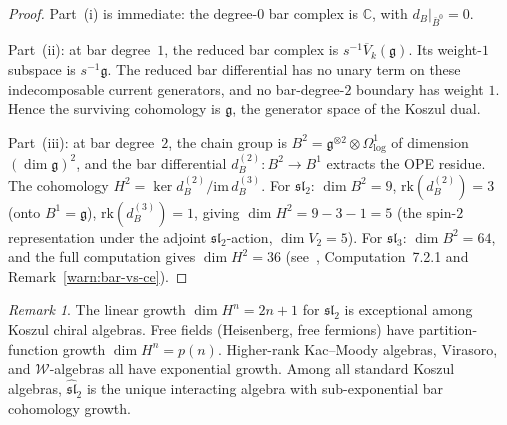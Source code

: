 \documentclass[11pt]{article}
\theoremstyle{plain}
\theoremstyle{definition}
\theoremstyle{remark}
\newtheorem{remark}[theorem]{Remark}
\newcommand{\fg}{\mathfrak{g}}
\newcommand{\fsl}{\mathfrak{sl}}
\newcommand{\barB}{\bar{B}}
\numberwithin{equation}{section}
\begin{document}
\begin{proof}
Part~(i) is immediate: the degree-$0$ bar complex is
$\mathbb{C}$, with $d_B|_{\barB^0} = 0$.

Part~(ii): at bar degree~$1$, the reduced bar complex is
\(s^{-1}\overline{V}_k(\fg)\). Its weight-\(1\) subspace is
\(s^{-1}\fg\). The reduced bar differential has no unary term on
these indecomposable current generators, and no bar-degree-\(2\)
boundary has weight \(1\). Hence the surviving cohomology is
\(\fg\), the generator space of the Koszul dual.

Part~(iii): at bar degree~$2$, the chain group is
$B^2 = \fg^{\otimes 2} \otimes \Omega^1_{\log}$
of dimension $(\dim\fg)^2$, and the bar differential
$d_B^{(2)}\colon B^2 \to B^1$ extracts the OPE
residue. The cohomology $H^2 = \ker d_B^{(2)} / \mathrm{im}\, d_B^{(3)}$.
For $\fsl_2$: $\dim B^2 = 9$, $\mathrm{rk}(d_B^{(2)}) = 3$
(onto $B^1 = \fg$), $\mathrm{rk}(d_B^{(3)}) = 1$,
giving $\dim H^2 = 9 - 3 - 1 = 5$
(the spin-$2$ representation under the adjoint
$\fsl_2$-action, $\dim V_2 = 5$).
For $\fsl_3$: $\dim B^2 = 64$, and the full computation
gives $\dim H^2 = 36$ (see~\cite{Lor-MKD},
Computation~7.2.1 and Remark~\ref{warn:bar-vs-ce}).
\end{proof}

\begin{remark}\label{rem:linear-growth}
The linear growth $\dim H^n = 2n + 1$ for $\fsl_2$
is exceptional among Koszul chiral algebras. Free fields
(Heisenberg, free fermions) have partition-function growth
$\dim H^n = p(n)$. Higher-rank Kac--Moody algebras,
Virasoro, and $\mathcal{W}$-algebras all have exponential
growth. Among all standard Koszul algebras,
$\widehat{\fsl}_2$ is the unique interacting algebra with
sub-exponential bar cohomology growth.
\end{remark}
\end{document}
